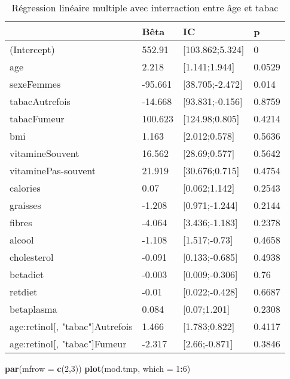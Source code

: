 \documentclass[]{article}
\newenvironment{Shaded}{\begin{snugshade}}{\end{snugshade}}
\newcommand{\KeywordTok}[1]{\textcolor[rgb]{0.13,0.29,0.53}{\textbf{#1}}}
\newcommand{\DataTypeTok}[1]{\textcolor[rgb]{0.13,0.29,0.53}{#1}}
\newcommand{\DecValTok}[1]{\textcolor[rgb]{0.00,0.00,0.81}{#1}}
\newcommand{\OperatorTok}[1]{\textcolor[rgb]{0.81,0.36,0.00}{\textbf{#1}}}
\newcommand{\NormalTok}[1]{#1}
\begin{document}
\begin{table}

\caption{\label{tab:unnamed-chunk-49}Régression linéaire multiple avec interraction entre âge et tabac}
\centering
\begin{tabular}[t]{l|l|l|l}
\hline
  & Bêta & IC & p\\
\hline
\rowcolor[HTML]{BBD2E1}  (Intercept) & 552.91 & [103.862;5.324] & 0\\
\hline
age & 2.218 & [1.141;1.944] & 0.0529\\
\hline
\rowcolor[HTML]{BBD2E1}  sexeFemmes & -95.661 & [38.705;-2.472] & 0.014\\
\hline
tabacAutrefois & -14.668 & [93.831;-0.156] & 0.8759\\
\hline
\rowcolor[HTML]{BBD2E1}  tabacFumeur & 100.623 & [124.98;0.805] & 0.4214\\
\hline
bmi & 1.163 & [2.012;0.578] & 0.5636\\
\hline
\rowcolor[HTML]{BBD2E1}  vitamineSouvent & 16.562 & [28.69;0.577] & 0.5642\\
\hline
vitaminePas-souvent & 21.919 & [30.676;0.715] & 0.4754\\
\hline
\rowcolor[HTML]{BBD2E1}  calories & 0.07 & [0.062;1.142] & 0.2543\\
\hline
graisses & -1.208 & [0.971;-1.244] & 0.2144\\
\hline
\rowcolor[HTML]{BBD2E1}  fibres & -4.064 & [3.436;-1.183] & 0.2378\\
\hline
alcool & -1.108 & [1.517;-0.73] & 0.4658\\
\hline
\rowcolor[HTML]{BBD2E1}  cholesterol & -0.091 & [0.133;-0.685] & 0.4938\\
\hline
betadiet & -0.003 & [0.009;-0.306] & 0.76\\
\hline
\rowcolor[HTML]{BBD2E1}  retdiet & -0.01 & [0.022;-0.428] & 0.6687\\
\hline
betaplasma & 0.084 & [0.07;1.201] & 0.2308\\
\hline
\rowcolor[HTML]{BBD2E1}  age:retinol[, "tabac"]Autrefois & 1.466 & [1.783;0.822] & 0.4117\\
\hline
age:retinol[, "tabac"]Fumeur & -2.317 & [2.66;-0.871] & 0.3846\\
\hline
\end{tabular}
\end{table}

\begin{Shaded}
\begin{Highlighting}[]
\KeywordTok{par}\NormalTok{(}\DataTypeTok{mfrow =} \KeywordTok{c}\NormalTok{(}\DecValTok{2}\NormalTok{,}\DecValTok{3}\NormalTok{))}
\KeywordTok{plot}\NormalTok{(mod.tmp, }\DataTypeTok{which =} \DecValTok{1}\OperatorTok{:}\DecValTok{6}\NormalTok{)}
\end{Highlighting}
\end{Shaded}
\end{document}
